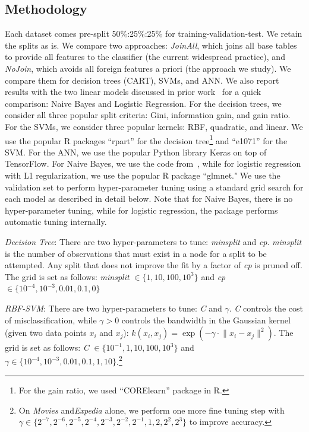\documentclass{vldb}
\begin{document}
\subsection{Methodology}
Each dataset comes pre-split 50\%:25\%:25\% for training-validation-test. We retain the splits as is.
We compare two approaches: \textit{JoinAll}, which joins all base tables to provide all features to the classifier (the current widespread practice), and \textit{NoJoin},
which avoids all foreign features a priori (the approach we study). We compare them for decision trees (CART), SVMs, and ANN. We also report results with the two 
linear models discussed in prior work~\cite{hamlet} for a quick comparison: Naive Bayes and Logistic Regression.
For the decision trees, we consider all three popular split criteria: Gini, information gain, and gain ratio.
For the SVMs, we consider three popular kernels: RBF, quadratic, and linear.
We use the popular R packages ``rpart'' for the decision tree\footnote{For the gain 
ratio, we used ``CORElearn'' package in R.} and ``e1071'' for the SVM.  For the ANN, we use the popular Python library Keras on top of TensorFlow.
For Naive Bayes, we use the code from~\cite{hamlet}, while for logistic regression with L1 regularization, we use the popular R package ``glmnet."
We use the validation set to perform hyper-parameter tuning using a standard grid search for each model as described in detail below. Note that 
for Naive Bayes, there is no hyper-parameter tuning, while for logistic regression, the package performs automatic tuning internally.

\vspace{2mm}
\noindent \textit{Decision Tree}: There are two hyper-parameters to tune: \textit{minsplit} and \textit{cp}. \textit{minsplit} is the number of observations that 
must exist in a node for a split to be attempted. Any split that does not improve the fit by a factor of \textit{cp} is pruned off. 
The grid is set as follows: \textit{minsplit} $\in \{ 1, 10, 100, 10^3\}$ and \textit{cp} $\in \{10^{-4}, 10^{-3}, 0.01, 0.1, 0\}$   

\vspace{2mm}
\noindent \textit{RBF-SVM}: There are two hyper-parameters to tune: \textit{C} and $\gamma$. \textit{C} controls the cost of misclassification, while $\gamma > 0$ controls the bandwidth in the Gaussian kernel (given two data points $x_i$ and $x_j$): $k(x_i,x_j) = \exp(-\gamma \cdot \lVert{x_i - x_j} \rVert ^2 )$.
The grid is set as follows: \textit{C} $\in \{10^{-1}, 1, 10, 100, 10^3\}$ and $\gamma \in \{10^{-4}, 10^{-3}, 0.01, 0.1, 1, 10\}$.\footnote{On 
\textit{Movies} and\textit{Expedia} alone, we perform one more fine tuning step with $\gamma \in \{2^{-7}, 2^{-6},2^{-5}, 2^{-4}, 2^{-3}, 2^{-2},2^{-1}, 1,2, 2^{2}, 2^{3}\}$ to improve accuracy.}
\end{document}
